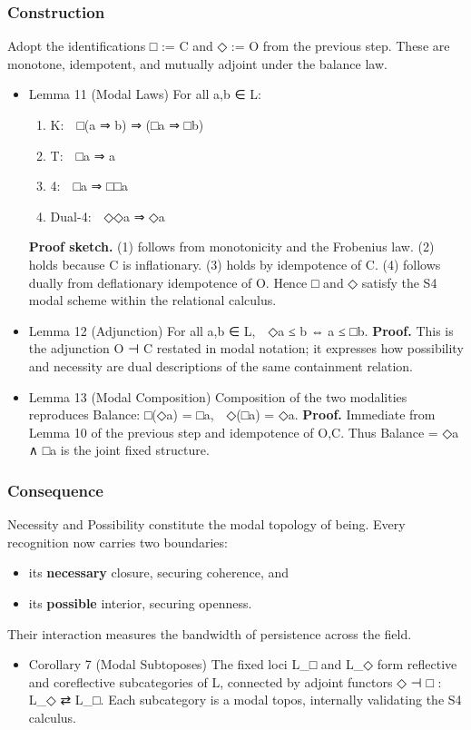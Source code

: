 \documentclass[11pt]{article}
\begin{document}
\subsubsection*{Construction}
\label{sec:org572bf42}
Adopt the identifications □ := C and ◇ := O from the previous step.  
These are monotone, idempotent, and mutually adjoint under the balance law.
\begin{itemize}
\item Lemma 11 (Modal Laws)
\label{sec:orgeb6e7e6}
For all a,b ∈ L:

\begin{enumerate}
\item K: □(a ⇒ b) ⇒ (□a ⇒ □b)
\item T: □a ⇒ a
\item 4: □a ⇒ □□a
\item Dual-4: ◇◇a ⇒ ◇a
\end{enumerate}

\textbf{Proof sketch.}  
(1) follows from monotonicity and the Frobenius law.  
(2) holds because C is inflationary.  
(3) holds by idempotence of C.  
(4) follows dually from deflationary idempotence of O.  
Hence □ and ◇ satisfy the S4 modal scheme within the relational calculus.
\item Lemma 12 (Adjunction)
\label{sec:org9833cd0}
For all a,b ∈ L, ◇a ≤ b  ⇔  a ≤ □b.  
\textbf{Proof.}  
This is the adjunction O ⊣ C restated in modal notation; it expresses how possibility and necessity are dual descriptions of the same containment relation.
\item Lemma 13 (Modal Composition)
\label{sec:orgfcb1fd6}
Composition of the two modalities reproduces Balance:
□(◇a) = □a, ◇(□a) = ◇a.  
\textbf{Proof.}  
Immediate from Lemma 10 of the previous step and idempotence of O,C.  
Thus Balance = ◇a ∧ □a is the joint fixed structure.
\end{itemize}
\subsubsection*{Consequence}
\label{sec:orgb50c284}
Necessity and Possibility constitute the modal topology of being.  
Every recognition now carries two boundaries:
\begin{itemize}
\item its \textbf{necessary} closure, securing coherence, and
\item its \textbf{possible} interior, securing openness.
\end{itemize}
Their interaction measures the bandwidth of persistence across the field.
\begin{itemize}
\item Corollary 7 (Modal Subtoposes)
\label{sec:orgececb9d}
The fixed loci L\_□ and L\_◇ form reflective and coreflective subcategories of L, connected by adjoint functors  
◇ ⊣ □ : L\_◇ ⇄ L\_□.  
Each subcategory is a modal topos, internally validating the S4 calculus.
\end{itemize}
\end{document}
